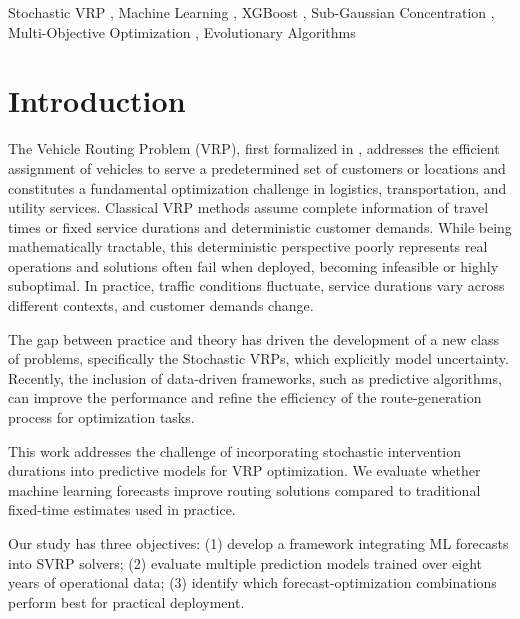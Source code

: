 \documentclass[preprint,12pt]{elsarticle}
\begin{document}
\begin{frontmatter}
\begin{keyword}
Stochastic VRP \sep
Machine Learning \sep
XGBoost \sep
Sub-Gaussian Concentration \sep
Multi-Objective Optimization \sep
Evolutionary Algorithms 
\end{keyword}

\end{frontmatter}

\section{Introduction}

The Vehicle Routing Problem (VRP), first formalized in \cite{danzig}, addresses the efficient assignment of vehicles to serve a predetermined set of customers or locations and constitutes a fundamental optimization challenge in logistics, transportation, and utility services. Classical VRP methods assume complete information of travel times or fixed service durations and deterministic customer demands. While being mathematically tractable, this deterministic perspective poorly represents real operations and solutions often fail when deployed, becoming infeasible or highly suboptimal. In practice, traffic conditions fluctuate, service durations vary across different contexts, and customer demands change.



The gap between practice and theory has driven the development of a new class of problems, specifically the Stochastic VRPs, which explicitly model uncertainty. Recently, the inclusion of data-driven frameworks, such as predictive algorithms, can improve the performance and refine the efficiency of the route-generation process for optimization tasks.




  
This work addresses the challenge of incorporating stochastic intervention durations into predictive models for VRP optimization. We evaluate whether machine learning forecasts improve routing solutions compared to traditional fixed-time estimates used in practice.

Our study has three objectives: (1) develop a framework integrating ML forecasts into SVRP solvers; (2) evaluate multiple prediction models trained over eight years of operational data; (3) identify which forecast-optimization combinations perform best for practical deployment.
\end{document}
